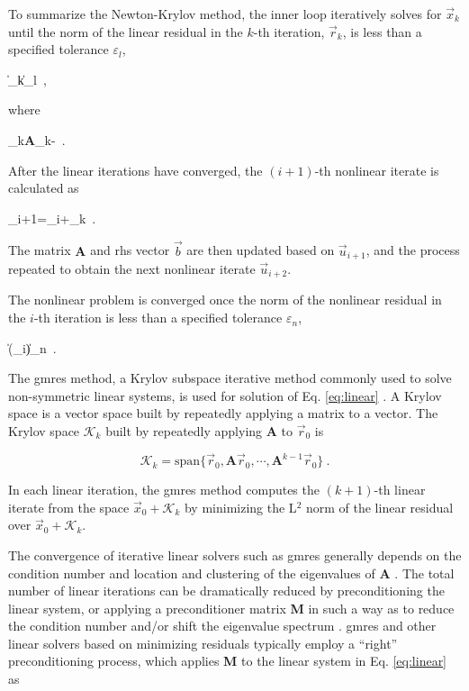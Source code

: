 To summarize the Newton-Krylov method, the inner loop iteratively solves for \(\vec{x}_k\) until the norm of the linear residual in the \(k\)-th iteration, \(\vec{r}_k\), is less than a specified tolerance \(\varepsilon_l\),

\beq
\label{eq:convergence_linear}
\|_k\|\leq\varepsilon_l\ ,
\eeq 

\noindent where

\beq
\label{eq:linear_residual}
_k\equiv\textbf{A}_k-\ .
\eeq

\noindent After the linear iterations have converged, the \((i+1)\)-th nonlinear iterate is calculated as

\beq
{}_{i+1}=_i+_k\ .
\eeq

\noindent The matrix \(\textbf{A}\) and \gls{rhs} vector \(\vec{b}\) are then updated based on \(\vec{u}_{i+1}\), and the process repeated to obtain the next nonlinear iterate \(\vec{u}_{i+2}\). 

The nonlinear problem is converged once the norm of the nonlinear residual in the \(i\)-th iteration is less than a specified tolerance \(\varepsilon_n\),

\beq
\|(_i)\|\leq\varepsilon_n\ .
\eeq

\noindent The \gls{gmres} method, a Krylov subspace iterative method commonly used to solve non-symmetric linear systems, is used for solution of Eq. \eqref{eq:linear} \cite{saad}. A Krylov space is a vector space built by repeatedly applying a matrix to a vector. The Krylov space \(\mathcal{K}_k\) built by repeatedly applying \(\textbf{A}\) to \(\vec{r}_0\) is

\begin{equation}
\label{eq:krylov_space}
\mathcal{K}_k=\textrm{span}\{\vec{r}_0, \textbf{A}\vec{r}_0, \cdots, \textbf{A}^{k-1}\vec{r}_0\}\ .
\end{equation}

\noindent In each linear iteration, the \gls{gmres} method computes the \((k+1)\)-th linear iterate from the space \(\vec{x}_0+\mathcal{K}_k\) by minimizing the L$^2$ norm of the linear residual over \(\vec{x}_0+\mathcal{K}_k\). 

The convergence of iterative linear solvers such as \gls{gmres} generally depends on the condition number and location and clustering of the eigenvalues of \textbf{A} \cite{trefethen}. The total number of linear iterations can be dramatically reduced by preconditioning the linear system, or applying a preconditioner matrix \textbf{M} in such a way as to reduce the condition number and/or shift the eigenvalue spectrum \cite{benzi}. \gls{gmres} and other linear solvers based on minimizing residuals typically employ a ``right'' preconditioning process, which applies \textbf{M} to the linear system in Eq. \eqref{eq:linear} as

